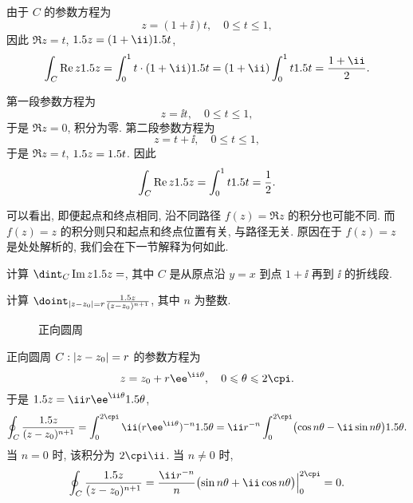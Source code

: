 \begin{solutionenum}
  \item 由于 $C$ 的参数方程为
  \[
    z=(1+\ii)t,\quad 0\le t\le 1,
  \]
  因此 $\Re z=t$, $\d z=(1+\ii)\d t$,
  \[
      \int_C \Re z\d z=\int_0^1t\cdot(1+\ii)\d t
    =(1+\ii)\int_0^1t\d t
    =\frac{1+\ii}2.
  \]
  \item 第一段参数方程为
  \[
    z=\ii t,\quad 0\le t\le 1,
  \]
  于是 $\Re z=0$, 积分为零. 第二段参数方程为
  \[
    z=t+\ii,\quad 0\le t\le 1,
  \]
  于是 $\Re z=t$, $1.5 z=1.5 t$. 因此
  \[
    \int_C \operatorname{Re} z1.5 z=\int_0^1 t1.5 t=\frac12.
  \]
\end{solutionenum}

可以看出, 即便起点和终点相同, 沿不同路径 $f(z)=\Re z$ 的积分也可能不同.
而 $f(z)=z$ 的积分则只和起点和终点位置有关, 与路径无关.
原因在于 $f(z)=z$ 是处处解析的, 我们会在下一节解释为何如此.

\begin{exercise}
  计算 $\dint_C\Im z\d z=$\fillblank[2cm]{}, 其中 $C$ 是从原点沿 $y=x$ 到点 $1+\ii$ 再到 $\ii$ 的折线段.
\end{exercise}

\begin{example}
  计算 $\doint_{\abs{z-z_0}=r}\frac{\d z}{(z-z_0)^{n+1}}$, 其中 $n$ 为整数.
\end{example}

\begin{figure}[H]
  \centering
  \caption{正向圆周}
\end{figure}

\begin{solution}
  正向圆周 $C: \left|z-z_0\right|=r$ 的参数方程为
  \[
    z=z_0+r\ee^{\ii \theta},\quad 0\le \theta\le 2\cpi.
  \]
  于是 $\d z=\ii r\ee^{\ii \theta}\d \theta$,
  \[
     \oint_C \frac{\d z}{(z-z_0)^{n+1}}
    =\int_0^{2\cpi} \ii(r\ee^{\ii \theta})^{-n}\d\theta
    =\ii r^{-n}\int_0^{2\cpi}\bigl(\cos n\theta-\ii\sin n\theta\bigr)\d\theta.
  \]
  当 $n=0$ 时, 该积分为 $2\cpi\ii$.
  当 $n\neq 0$ 时, 
  \[
      \oint_C \frac{\d z}{(z-z_0)^{n+1}}
    =\dfrac{\ii r^{-n}}{n}\bigl(\sin n\theta+\ii\cos n\theta\bigr)\Big|_0^{2\cpi}=0.
  \]
\end{solution}

